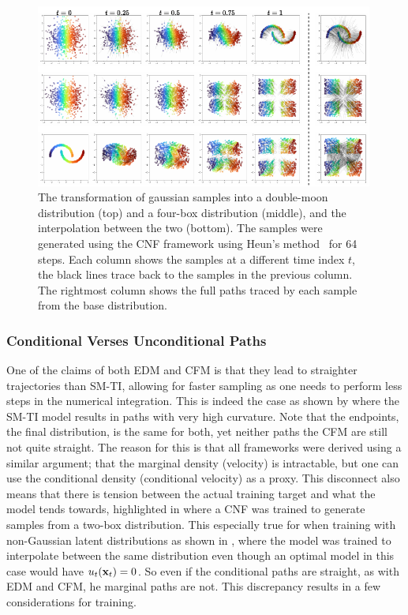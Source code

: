 \begin{figure}[ht]
    \centering
    \includegraphics[width=0.99\textwidth]{Figures/transformers/cm_samples.pdf}
    \caption{The transformation of gaussian samples into a double-moon distribution (top) and a four-box distribution (middle), and the interpolation between the two (bottom). The samples were generated using the CNF framework using Heun's method~\cite{heun} for 64 steps. Each column shows the samples at a different time index $t$, the black lines trace back to the samples in the previous column. The rightmost column shows the full paths traced by each sample from the base distribution.}
    \label{fig:cm_samples}
\end{figure}


\subsubsection{Conditional Verses Unconditional Paths}

One of the claims of both EDM and CFM is that they lead to straighter trajectories than SM-TI, allowing for faster sampling as one needs to perform less steps in the numerical integration.
This is indeed the case as shown by  where the SM-TI model results in paths with very high curvature.
Note that the endpoints, the final distribution, is the same for both, yet neither paths the CFM are still not quite straight.
The reason for this is that all frameworks were derived using a similar argument; that the marginal density (velocity) is intractable, but one can use the conditional density (conditional velocity) as a proxy.
This disconnect also means that there is tension between the actual training target and what the model tends towards, highlighted in  where a CNF was trained to generate samples from a two-box distribution.
This especially true for when training with non-Gaussian latent distributions as shown in , where the model was trained to interpolate between the same distribution even though an optimal model in this case would have $u_t(\mathbf{x}_t) = 0$.
So even if the conditional paths are straight, as with EDM and CFM, he marginal paths are not.
This discrepancy results in a few considerations for training.

